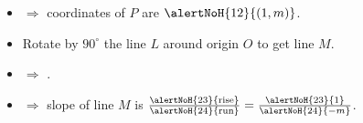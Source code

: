\begin{frame}
\begin{columns}
\begin{itemize}
\item<12-> $\Rightarrow$ coordinates of $P$ are $\alertNoH{12}{(1,m)}$.
\item<13-> Rotate by $90^\circ$ the line $L$ around origin $O$ to get line $M$. 
\item<15-> $\Rightarrow$ .
\item<22-> $\Rightarrow$ slope of line $M$ is $\frac{\alertNoH{23}{\text{rise}}}{\alertNoH{24}{\text{run}}}=\frac{\alertNoH{23}{1}}{\alertNoH{24}{-m}}$.
\end{itemize}
\end{columns}


\end{frame}